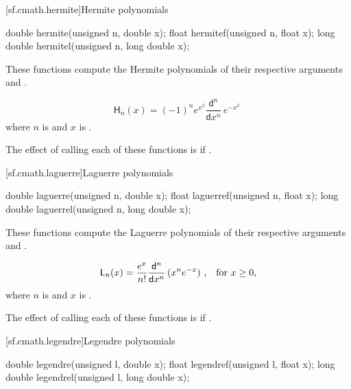 [sf.cmath.hermite]{Hermite polynomials}%
%
%
%
%
%
\begin{itemdecl}
double       hermite(unsigned n, double x);
float        hermitef(unsigned n, float x);
long double  hermitel(unsigned n, long double x);
\end{itemdecl}

\begin{itemdescr}
\pnum
\effects
These functions compute the Hermite polynomials
of their respective arguments
 and .

\pnum
\returns
\[%
  \mathsf{H}_n(x) =
  (-1)^n e^{x^2} \frac{ \mathsf{d} ^n}
		      { \mathsf{d}x^n} \, e^{-x^2}
\;
\]
where
$n$ is  and
$x$ is .

\pnum
\remarks
The effect of calling each of these functions
is 
if .
\end{itemdescr}

[sf.cmath.laguerre]{Laguerre polynomials}%
%
%
%
%
%
\begin{itemdecl}
double       laguerre(unsigned n, double x);
float        laguerref(unsigned n, float x);
long double  laguerrel(unsigned n, long double x);
\end{itemdecl}

\begin{itemdescr}
\pnum
\effects
These functions compute the Laguerre polynomials
of their respective arguments
 and .

\pnum
\returns
\[ \mathsf{L}_n(x) =
     \frac{e^x}{n!} \frac{\mathsf{d}^n}{\mathsf{d}x^n} \, (x^n e^{-x})
     \text{ ,\quad for $x \ge 0$,} \]
where
$n$ is  and
$x$ is .

\pnum
\remarks
The effect of calling each of these functions
is 
if .
\end{itemdescr}

[sf.cmath.legendre]{Legendre polynomials}%
%
%
%
%
%
\begin{itemdecl}
double       legendre(unsigned l, double x);
float        legendref(unsigned l, float x);
long double  legendrel(unsigned l, long double x);
\end{itemdecl}


